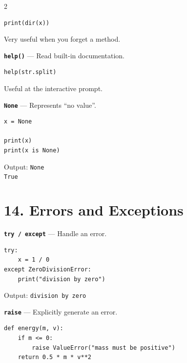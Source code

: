 \documentclass[10pt,a4paper]{article}
\begin{document}
\begin{multicols}{2}
\begin{card}
\begin{lstlisting}[style=pythonstyle]
print(dir(x))
\end{lstlisting}

Very useful when you forget a method.
\end{card}

\begin{card}
\textbf{\texttt{help()}} --- Read built-in documentation.

\begin{lstlisting}[style=pythonstyle]
help(str.split)
\end{lstlisting}

Useful at the interactive prompt.
\end{card}

\begin{card}
\textbf{\texttt{None}} --- Represents ``no value''.

\begin{lstlisting}[style=pythonstyle]
x = None

print(x)
print(x is None)
\end{lstlisting}

Output:
\texttt{None}\\
\texttt{True}
\end{card}

\section*{14. Errors and Exceptions}

\begin{card}
\textbf{\texttt{try / except}} --- Handle an error.

\begin{lstlisting}[style=pythonstyle]
try:
    x = 1 / 0
except ZeroDivisionError:
    print("division by zero")
\end{lstlisting}

Output:
\texttt{division by zero}
\end{card}

\begin{card}
\textbf{\texttt{raise}} --- Explicitly generate an error.

\begin{lstlisting}[style=pythonstyle]
def energy(m, v):
    if m <= 0:
        raise ValueError("mass must be positive")
    return 0.5 * m * v**2
\end{lstlisting}
\end{card}


\end{multicols}
\end{document}
